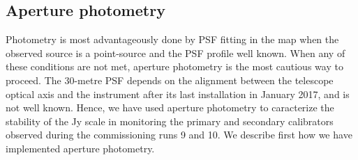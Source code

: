 %
%
%
%

\subsection{Aperture photometry}
\label{S:ApPh}

Photometry is most advantageously done by PSF fitting in the map when the observed source is a point-source and the PSF profile 
well known. When any of these conditions are not met, aperture photometry is the most cautious way to proceed.
The 30-metre PSF depends on the alignment between the telescope optical axis and the instrument 
after its last installation in January 2017, and is not well known. Hence, we have used aperture photometry to
caracterize the stability of the Jy scale in monitoring the
primary and secondary calibrators observed during the commissioning runs 9 and 10.
We describe first how we have implemented aperture photometry.

